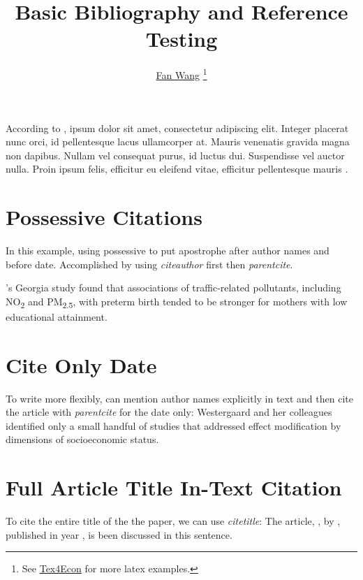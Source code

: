 \documentclass[12pt,english]{article}
\begin{document}
\title{Basic Bibliography and Reference Testing}
\author{\href{http://fanwangecon.github.io/}{Fan Wang} \thanks{See \href{https://fanwangecon.github.io/Tex4Econ/}{Tex4Econ} for more latex examples.}}

\maketitle

According to \textcite{becker_human_1986}, ipsum dolor sit amet, consectetur adipiscing elit. Integer placerat nunc orci, id pellentesque lacus ullamcorper at. Mauris venenatis gravida magna non dapibus. Nullam vel consequat purus, id luctus dui. Suspendisse vel auctor nulla. Proin ipsum felis, efficitur eu eleifend vitae, efficitur pellentesque mauris \autocite{case_lasting_2005, conti_understanding_2010}.


\section{Possessive Citations}

In this example, using possessive to put apostrophe after author names and before date. Accomplished by using \emph{citeauthor} first then \emph{parentcite}.

\citeauthor{hao_air_2016}'s \parencite*{hao_air_2016} Georgia study
found that associations of traffic-related pollutants, including NO\textsubscript{2} and
PM\textsubscript{2.5}, with preterm birth tended to be stronger for mothers with low
educational attainment.

\section{Cite Only Date}

To write more flexibly, can mention author names explicitly in text and then cite the article with \emph{parentcite} for the date only: Westergaard and her colleagues \parencite*{westergaard_ambient_2017} identified only a small handful of studies that addressed effect modification by dimensions of socioeconomic status.


\section{Full Article Title In-Text Citation}

To cite the entire title of the the paper, we can use \emph{citetitle}: The article, , by \citeauthor{conti_understanding_2010}, published in year \cite*{conti_understanding_2010}, is been discussed in this sentence. 
\end{document}
